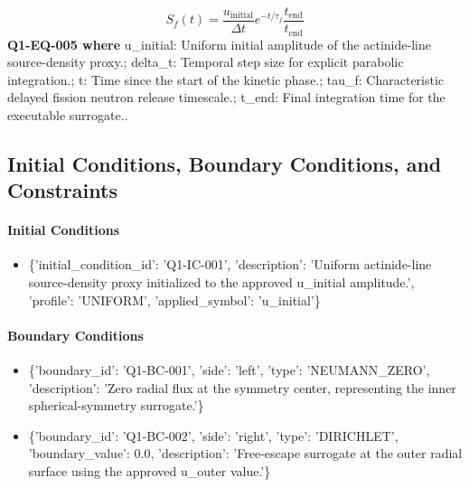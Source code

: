 \documentclass[11pt]{article}
\begin{document}
\begin{equation}\label{eq:Q1-EQ-005}
S_f(t) = \frac{u_{\mathrm{initial}}}{\Delta t} e^{-t/\tau_f} \frac{t_{\mathrm{end}}}{t_{\mathrm{end}}}
\end{equation}
\noindent\textbf{Q1-EQ-005 where} u\_initial: Uniform initial amplitude of the actinide-line source-density proxy.; delta\_t: Temporal step size for explicit parabolic integration.; t: Time since the start of the kinetic phase.; tau\_f: Characteristic delayed fission neutron release timescale.; t\_end: Final integration time for the executable surrogate..

\subsection{Initial Conditions, Boundary Conditions, and Constraints}

\paragraph{Initial Conditions}
\begin{itemize}\raggedright
\item \{'initial\_\allowbreak{}condition\_\allowbreak{}id': 'Q1-IC-001', 'description': 'Uniform actinide-line source-density proxy initialized to the approved u\_\allowbreak{}initial amplitude.', 'profile': 'UNIFORM', 'applied\_\allowbreak{}symbol': 'u\_\allowbreak{}initial'\}
\end{itemize}

\paragraph{Boundary Conditions}
\begin{itemize}\raggedright
\item \{'boundary\_\allowbreak{}id': 'Q1-BC-001', 'side': 'left', 'type': 'NEUMANN\_\allowbreak{}ZERO', 'description': 'Zero radial flux at the symmetry center, representing the inner spherical-symmetry surrogate.'\}
\item \{'boundary\_\allowbreak{}id': 'Q1-BC-002', 'side': 'right', 'type': 'DIRICHLET', 'boundary\_\allowbreak{}value': 0.0, 'description': 'Free-escape surrogate at the outer radial surface using the approved u\_\allowbreak{}outer value.'\}
\end{itemize}
\end{document}
